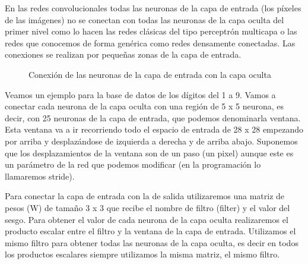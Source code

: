 \documentclass[
  a4paper,
  DIV=11,
  numbers=noendperiod]{scrreprt}
\begin{document}
En las redes convolucionales todas las neuronas de la capa de entrada
(los píxeles de las imágenes) no se conectan con todas las neuronas de
la capa oculta del primer nivel como lo hacen las redes clásicas del
tipo perceptrón multicapa o las redes que conocemos de forma genérica
como redes densamente conectadas. Las conexiones se realizan por
pequeñas zonas de la capa de entrada.

\begin{figure}


\caption{\label{fig-conexion-neuronas-convolucional}Conexión de las
neuronas de la capa de entrada con la capa oculta}

\end{figure}%

Veamos un ejemplo para la base de datos de los dígitos del 1 a 9. Vamos
a conectar cada neurona de la capa oculta con una región de 5 x 5
neurona, es decir, con 25 neuronas de la capa de entrada, que podemos
denominarla ventana. Esta ventana va a ir recorriendo todo el espacio de
entrada de 28 x 28 empezando por arriba y desplazándose de izquierda a
derecha y de arriba abajo. Suponemos que los desplazamientos de la
ventana son de un paso (un pixel) aunque este es un parámetro de la red
que podemos modificar (en la programación lo llamaremos stride).

Para conectar la capa de entrada con la de salida utilizaremos una
matriz de pesos (W) de tamaño 3 x 3 que recibe el nombre de filtro
(filter) y el valor del sesgo. Para obtener el valor de cada neurona de
la capa oculta realizaremos el producto escalar entre el filtro y la
ventana de la capa de entrada. Utilizamos el mismo filtro para obtener
todas las neuronas de la capa oculta, es decir en todos los productos
escalares siempre utilizamos la misma matriz, el mismo filtro.
\end{document}
